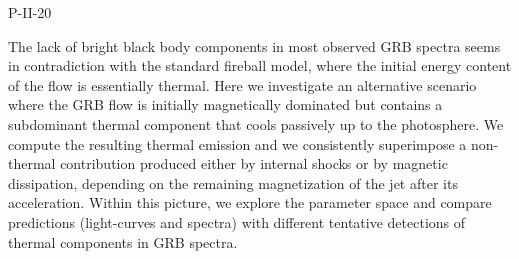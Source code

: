 P-II-20


\bigskip



\bigskip

\noindent The lack of bright black body components in most observed GRB spectra seems in contradiction with the standard fireball model, where the initial energy content of the flow is essentially thermal. Here we investigate an alternative scenario where the GRB flow is initially magnetically dominated but contains a subdominant thermal component that cools passively up to the photosphere. We compute the resulting thermal emission and we consistently superimpose a non-thermal contribution produced either by internal shocks or by magnetic dissipation, depending on the remaining magnetization of the jet after its acceleration. Within this picture, we explore the parameter space and compare predictions (light-curves and spectra) with different tentative detections of thermal components in GRB spectra.

